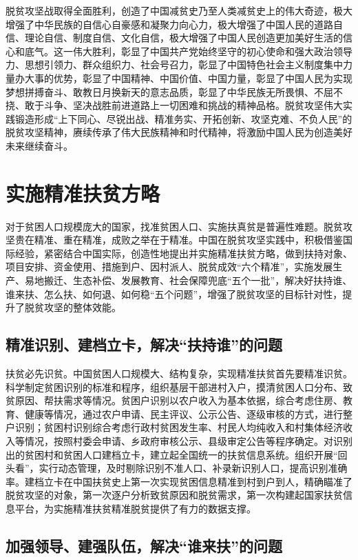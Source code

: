 \documentclass{ctexart}
\begin{document}
脱贫攻坚战取得全面胜利，创造了中国减贫史乃至人类减贫史上的伟大奇迹，极大增强了中华民族的自信心自豪感和凝聚力向心力，极大增强了中国人民的道路自信、理论自信、制度自信、文化自信，极大增强了中国人民创造更加美好生活的信心和底气。这一伟大胜利，彰显了中国共产党始终坚守的初心使命和强大政治领导力、思想引领力、群众组织力、社会号召力，彰显了中国特色社会主义制度集中力量办大事的优势，彰显了中国精神、中国价值、中国力量，彰显了中国人民为实现梦想拼搏奋斗、敢教日月换新天的意志品质，彰显了中华民族无所畏惧、不屈不挠、敢于斗争、坚决战胜前进道路上一切困难和挑战的精神品格。脱贫攻坚伟大实践锻造形成“上下同心、尽锐出战、精准务实、开拓创新、攻坚克难、不负人民”的脱贫攻坚精神，赓续传承了伟大民族精神和时代精神，将激励中国人民为创造美好未来继续奋斗。

\section{实施精准扶贫方略}

对于贫困人口规模庞大的国家，找准贫困人口、实施扶真贫是普遍性难题。脱贫攻坚贵在精准、重在精准，成败之举在于精准。中国在脱贫攻坚实践中，积极借鉴国际经验，紧密结合中国实际，创造性地提出并实施精准扶贫方略，做到扶持对象、项目安排、资金使用、措施到户、因村派人、脱贫成效“六个精准”，实施发展生产、易地搬迁、生态补偿、发展教育、社会保障兜底“五个一批”，解决好扶持谁、谁来扶、怎么扶、如何退、如何稳“五个问题”，增强了脱贫攻坚的目标针对性，提升了脱贫攻坚的整体效能。

\subsection{精准识别、建档立卡，解决“扶持谁”的问题}

扶贫必先识贫。中国贫困人口规模大、结构复杂，实现精准扶贫首先要精准识贫。科学制定贫困识别的标准和程序，组织基层干部进村入户，摸清贫困人口分布、致贫原因、帮扶需求等情况。贫困户识别以农户收入为基本依据，综合考虑住房、教育、健康等情况，通过农户申请、民主评议、公示公告、逐级审核的方式，进行整户识别；贫困村识别综合考虑行政村贫困发生率、村民人均纯收入和村集体经济收入等情况，按照村委会申请、乡政府审核公示、县级审定公告等程序确定。对识别出的贫困村和贫困人口建档立卡，建立起全国统一的扶贫信息系统。组织开展“回头看”，实行动态管理，及时剔除识别不准人口、补录新识别人口，提高识别准确率。建档立卡在中国扶贫史上第一次实现贫困信息精准到村到户到人，精确瞄准了脱贫攻坚的对象，第一次逐户分析致贫原因和脱贫需求，第一次构建起国家扶贫信息平台，为实施精准扶贫精准脱贫提供了有力的数据支撑。

\subsection{加强领导、建强队伍，解决“谁来扶”的问题}
\end{document}
